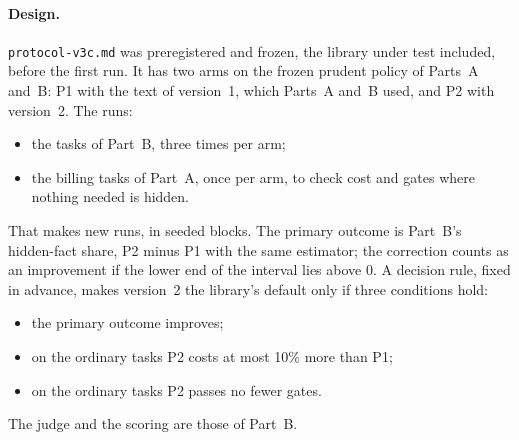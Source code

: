 \paragraph{Design.} \texttt{protocol-v3c.md} was preregistered and frozen, the library under test included,
before the first run. It has two arms on the frozen prudent policy of Parts~A and~B: P1 with the text of
version~1, which Parts~A and~B used, and P2 with version~2. The runs:
\begin{itemize}
\item the \SfourCHardTasks{} tasks of Part~B, three times per arm;
\item the \SfourCOrdinaryTasks{} billing tasks of Part~A, once per arm, to check cost and gates where nothing
needed is hidden.
\end{itemize}
That makes \SfourCRuns{} new runs, in seeded blocks. The primary outcome is Part~B's hidden-fact share, P2
minus P1 with the same estimator; the correction counts as an improvement if the lower end of the interval lies
above 0. A decision rule, fixed in advance, makes version~2 the library's default only if three conditions hold:
\begin{itemize}
\item the primary outcome improves;
\item on the ordinary tasks P2 costs at most 10\% more than P1;
\item on the ordinary tasks P2 passes no fewer gates.
\end{itemize}
The judge and the scoring are those of Part~B.

\begin{table}[t]
\centering\small

\caption{Study~4C: the same frozen projection with the skill text of version~1 (P1) and version~2 (P2), on the
tasks of Part~B (\SfourCRunsPerArm{} runs per arm); costs also on the ordinary tasks of Part~A. Shares are averaged
within task, tasks weighted equally. Intervals: 95\%
bootstrap over tasks. The primary outcome and its interval are in bold.}
\label{tab:s4c}
\end{table}

